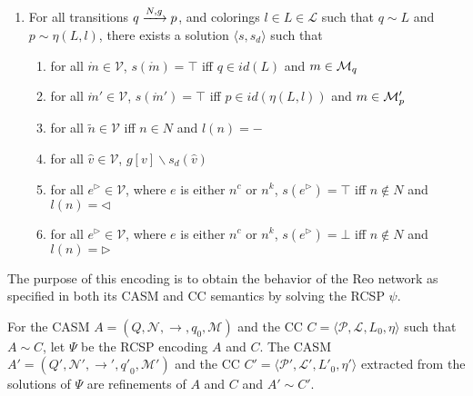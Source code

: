 \begin{definition}
\begin{enumerate}
\item For all transitions $q\xrightarrow{N,g}p$, and colorings $l \in L \in \mathcal{L}$ such that $q \sim L$ and $p \sim \eta(L, l)$, there exists a solution $\langle s, s_d \rangle$ such that 
\begin{enumerate}
\item for all $\mathring{m} \in \mathcal{V}$, $s(\mathring{m})=\top$ iff $q \in id(L)$ and $m \in {\cal M}_q$ 
\item for all $\mathring{m}' \in \mathcal{V}$, $s(\mathring{m}')=\top$ iff $p \in id(\eta(L, l))$ and $m \in {\cal M}'_p$ 
\item for all $\tilde{n} \in \mathcal{V}$ iff $n \in N$ and  $l(n)=-$
\item for all $\hat{v} \in \mathcal{V}$, $g\left[v\right] \backslash s_d\left(\hat{v}\right)$
\item for all ${e}^\triangleright \in \mathcal{V}$, where $e$ is either $n^c$ or $n^k$, $s({e}^\triangleright)=\top$ iff $n \notin N$ and  $l(n)=\triangleleft$ 
\item for all ${e}^\triangleright \in \mathcal{V}$, where $e$ is either $n^c$ or $n^k$, $s({e}^\triangleright)=\bot$ iff $n \notin N$ and  $l(n)=\triangleright$ 
\end{enumerate}
\end{enumerate}
\end{definition}

The purpose of this encoding is to obtain the behavior of the Reo network as specified in both its CASM and CC semantics by solving the RCSP $\psi$.


\begin{theorem}[Correctness]
For the CASM $A = \left(Q, \mathcal{N}, \rightarrow, q_0, \mathcal{M}\right)$ and the CC $C = \langle \mathcal{P}, \mathcal{L}, L_0, \eta \rangle$ such that $A \sim C$, let $\Psi$ be the RCSP encoding $A$ and $C$. The CASM $A'=\left(Q', \mathcal{N}', \rightarrow', {q'}_0, \mathcal{M}'\right)$ and the CC $C' = \langle \mathcal{P}', \mathcal{L}', {L'}_0, \eta' \rangle$ extracted from the solutions of $\Psi$ are refinements of $A$ and $C$ and $A' \sim C'$.
\end{theorem}
 
